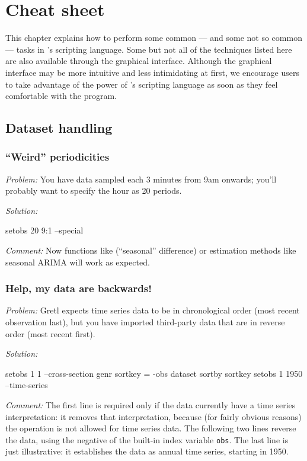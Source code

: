 \chapter{Cheat sheet}
\label{chap:cheatsheet}

This chapter explains how to perform some common --- and some not so
common --- tasks in 's scripting language.  Some but not
all of the techniques listed here are also available through the
graphical interface.  Although the graphical interface may be more
intuitive and less intimidating at first, we encourage users to take
advantage of the power of 's scripting language as soon as
they feel comfortable with the program.

\section{Dataset handling}

\subsection{``Weird'' periodicities}

\emph{Problem:} You have data sampled each 3 minutes from 9am onwards;
you'll probably want to specify the hour as 20 periods.

\emph{Solution:}
\begin{code}
setobs 20 9:1 --special
\end{code}

\emph{Comment:} Now functions like  (``seasonal''
difference) or estimation methods like seasonal ARIMA will work as
expected.

\subsection{Help, my data are backwards!}

\emph{Problem:} Gretl expects time series data to be in chronological
order (most recent observation last), but you have imported
third-party data that are in reverse order (most recent first).

\emph{Solution:}
\begin{code}
setobs 1 1 --cross-section
genr sortkey = -obs
dataset sortby sortkey
setobs 1 1950 --time-series
\end{code}

\emph{Comment:} The first line is required only if the data currently
have a time series interpretation: it removes that interpretation,
because (for fairly obvious reasons) the 
operation is not allowed for time series data.  The following two
lines reverse the data, using the negative of the built-in index
variable \texttt{obs}.  The last line is just illustrative: it
establishes the data as annual time series, starting in 1950.

